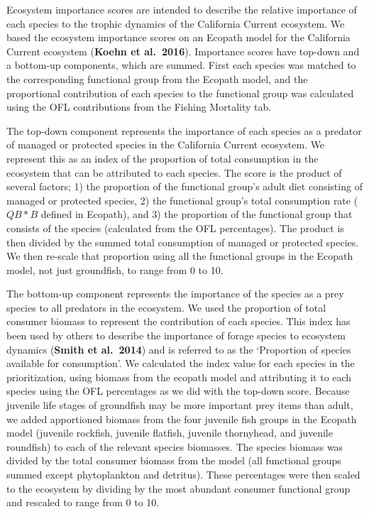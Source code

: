 \documentclass[11pt,
  english,
  a4paper,
]{article}
\begin{document}

Ecosystem importance scores are intended to describe the relative importance of each species to the trophic dynamics of the California Current ecosystem. We based the ecosystem importance scores on an Ecopath model for the California Current ecosystem (\textbf{Koehn et al.~2016}). Importance scores have top-down and a bottom-up components, which are summed. First each species was matched to the corresponding functional group from the Ecopath model, and the proportional contribution of each species to the functional group was calculated using the OFL contributions from the Fishing Mortality tab.

\leavevmode\tagmcend\tagstructend\par


The top-down component represents the importance of each species as a predator of managed or protected species in the California Current ecosystem. We represent this as an index of the proportion of total consumption in the ecosystem that can be attributed to each species. The score is the product of several factors; 1) the proportion of the functional group's adult diet consisting of managed or protected species, 2) the functional group's total consumption rate ({\(QB*B\)\leavevmode\tagmcend\tagstructend} defined in Ecopath), and 3) the proportion of the functional group that consists of the species (calculated from the OFL percentages). The product is then divided by the summed total consumption of managed or protected species. We then re-scale that proportion using all the functional groups in the Ecopath model, not just groundfish, to range from 0 to 10.

\leavevmode\tagmcend\tagstructend\par


The bottom-up component represents the importance of the species as a prey species to all predators in the ecosystem. We used the proportion of total consumer biomass to represent the contribution of each species. This index has been used by others to describe the importance of forage species to ecosystem dynamics (\textbf{Smith et al.~2014}) and is referred to as the `Proportion of species available for consumption'. We calculated the index value for each species in the prioritization, using biomass from the ecopath model and attributing it to each species using the OFL percentages as we did with the top-down score. Because juvenile life stages of groundfish may be more important prey items than adult, we added apportioned biomass from the four juvenile fish groups in the Ecopath model (juvenile rockfish, juvenile flatfish, juvenile thornyhead, and juvenile roundfish) to each of the relevant species biomasses. The species biomass was divided by the total consumer biomass from the model (all functional groups summed except phytoplankton and detritus). These percentages were then scaled to the ecosystem by dividing by the most abundant consumer functional group and rescaled to range from 0 to 10.
\end{document}
